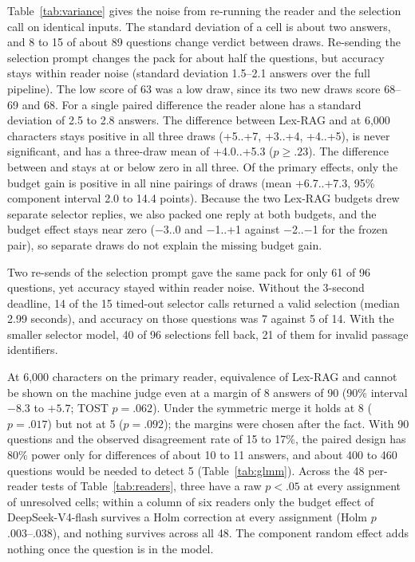 
Table~\ref{tab:variance} gives the noise from re-running the reader and the selection call on identical inputs. The standard deviation of a cell is about two answers, and 8 to 15 of about 89 questions change verdict between draws. Re-sending the selection prompt changes the pack for about half the questions, but accuracy stays within reader noise (standard deviation 1.5--2.1 answers over the full pipeline). The low \setr{} score of 63 was a low draw, since its two new draws score 68--69 and 68. For a single paired difference the reader alone has a standard deviation of 2.5 to 2.8 answers. The difference between Lex-RAG and \hybrid{} at 6,000 characters stays positive in all three draws (+5..+7, +3..+4, +4..+5), is never significant, and has a three-draw mean of +4.0..+5.3 ($p\ge .23$). The difference between \lexb{} and \hr{} stays at or below zero in all three. Of the primary effects, only the \hybrid{} budget gain is positive in all nine pairings of draws (mean +6.7..+7.3, 95\% component interval 2.0 to 14.4 points). Because the two Lex-RAG budgets drew separate selector replies, we also packed one reply at both budgets, and the budget effect stays near zero ($-$3..0 and $-$1..+1 against $-$2..$-$1 for the frozen pair), so separate draws do not explain the missing budget gain.

Two re-sends of the selection prompt gave the same pack for only 61 of 96 questions, yet accuracy stayed within reader noise. Without the 3-second deadline, 14 of the 15 timed-out selector calls returned a valid selection (median 2.99 seconds), and accuracy on those questions was 7 against 5 of 14. With the smaller selector model, 40 of 96 selections fell back, 21 of them for invalid passage identifiers.

At 6,000 characters on the primary reader, equivalence of Lex-RAG and \hr{} cannot be shown on the machine judge even at a margin of 8 answers of 90 (90\% interval $-8.3$ to $+5.7$; TOST $p=.062$). Under the symmetric merge it holds at 8 ($p=.017$) but not at 5 ($p=.092$); the margins were chosen after the fact. With 90 questions and the observed disagreement rate of 15 to 17\%, the paired design has 80\% power only for differences of about 10 to 11 answers, and about 400 to 460 questions would be needed to detect 5 (Table~\ref{tab:glmm}). Across the 48 per-reader tests of Table~\ref{tab:readers}, three have a raw $p<.05$ at every assignment of unresolved cells; within a column of six readers only the \hr{} budget effect of DeepSeek-V4-flash survives a Holm correction at every assignment (Holm $p$ .003--.038), and nothing survives across all 48. The component random effect adds nothing once the question is in the model.
